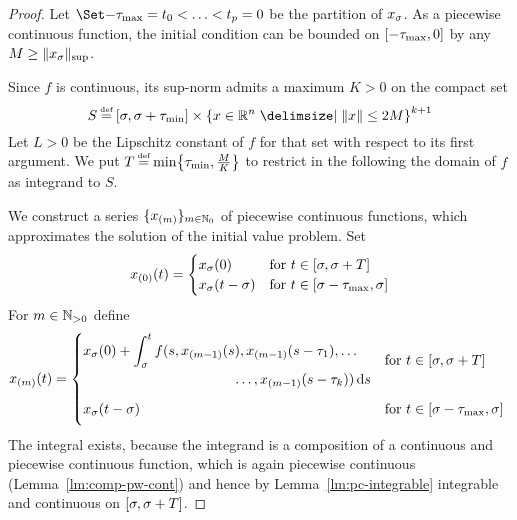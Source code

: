     \begin{proof}
        Let $\partition{-\taumax=t_0}{t_p=0}$ be the partition of $x_{\sigma}$. As a piecewise continuous function, the initial condition can be bounded on $[-\tau_{\max},0]$ by any $M\geq \lVert x_\sigma\rVert_{\sup}$.      
        
        Since $f$ is continuous, its sup-norm admits a maximum $K>0$
        on the compact set
        \begin{equation*}
            S\defeq\compactum{\tzero}{\tzero+\taumin} \times \set{x\in\R^n\with \nnorm{x}\leq 2M}^{k+1}
        \end{equation*}
        Let $L>0$ be the Lipschitz constant of $f$ for that set with respect to its first argument.
        We put $T\defeq\min\set{\taumin,\frac{M}{K}}$ to restrict in the following the domain of $f$ as integrand to $S$.

        We construct a series $\{x_{(m)}\}_{m\in\mathbb{N}_0}$ of piecewise continuous functions, which approximates the solution of the initial value problem. Set
        \begin{equation*}
            x_{(0)}(t)= \begin{cases}
                x_\sigma(0) & \text{for } t\in[\sigma,\sigma+T]\\
                x_\sigma(t-\sigma) & \text{for } t\in[\sigma-\tau_{\max},\sigma]
            \end{cases}
        \end{equation*}
        For $m\in\mathbb{N}_{>0}$ define
        \begin{equation*}
            x_{(m)}(t)= \begin{dcases*}
                \begin{multlined}[c][0.57\displaywidth]
                    x_\tzero(0) + \integral{\tzero}{t}
                f(s,x_{(m-1)}(s),x_{(m-1)}(s-\tau_1),\ldots\\
                \ldots,x_{(m-1)}(s-\tau_k))\dx[s] 
                \end{multlined} & for $t\in\compactum{\tzero}{\tzero+T}$\\
                x_\tzero(t-\tzero) \vphantom{\int} & for $t\in\compactum{\tzero-\taumax}{\tzero}$
            \end{dcases*}
        \end{equation*}
        The integral exists, because the integrand is a composition of a continuous and piecewise continuous function, which is again piecewise continuous (Lemma~\ref{lm:comp-pw-cont}) and hence by Lemma~\ref{lm:pc-integrable} integrable and continuous on $[\sigma,\sigma+T]$.


\end{proof}
